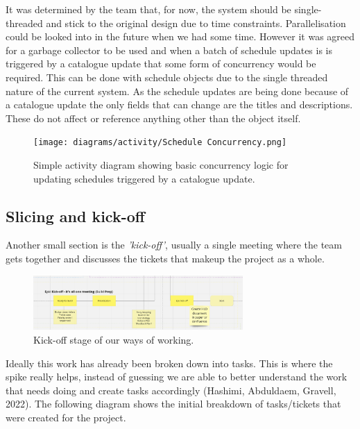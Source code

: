   It was determined by the team that, for now, the system should be single-threaded and stick to the original design due to time constraints.
  Parallelisation could be looked into in the future when we had some time. However it was agreed for a garbage collector to be used and 
  when a batch of schedule updates is is triggered by a catalogue update that some form of concurrency would be required. This can be done with schedule
  objects due to the single threaded nature of the current system. As the schedule updates are being done because of a catalogue update the only 
  fields that can change are the titles and descriptions. These do not affect or reference anything other than the object itself.

  \begin{figure}[H]
    \centering
    \texttt{[image: diagrams/activity/Schedule Concurrency.png]}
    \caption{Simple activity diagram showing basic concurrency logic for updating schedules triggered by a catalogue update.}
    \label{fig:scheduleConcurrency}
  \end{figure}

  \newpage
  \subsection{Slicing and kick-off}
  Another small section is the \textit{'kick-off'}, usually a single meeting where the team gets together and discusses the tickets that makeup
  the project as a whole. 

  \begin{figure}[H]
    \centering
    \includegraphics[width=8cm]{assets/workflow/kickoff.png}
    \caption{Kick-off stage of our ways of working.}
    \label{fig:workflowKickOff}
  \end{figure}
  
  Ideally this work has already been broken down into tasks. This is where the spike really helps, instead of guessing we are able to better understand 
  the work that needs doing and create tasks accordingly (Hashimi, Abduldaem, Gravell, 2022). The following diagram shows the initial breakdown of 
  tasks/tickets that were created for the project.

